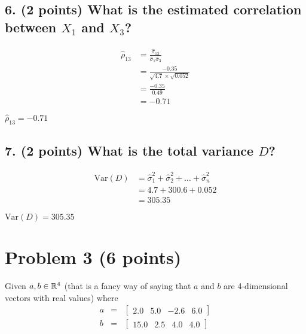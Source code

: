\documentclass[11pt]{article}
\begin{document}
\subsection*{\textbf{6. (2 points)} What is the estimated correlation between $X_1$ and $X_3$?}

\begin{align*}
    \hat{\rho}_{13} &= \frac{\hat{\sigma}_{13}}{\hat{\sigma}_1 \hat{\sigma}_3} \\
    &= \frac{-0.35}{ \sqrt{4.7} \times \sqrt{0.052}} \\
    &= \frac{-0.35}{0.49} \\
    &= -0.71
\end{align*}

\begin{tcolorbox}[title=Problem 2.6]
    $\hat{\rho}_{13} = -0.71$
\end{tcolorbox}

\subsection*{\textbf{7. (2 points)} What is the total variance $D$?}

\begin{align*}
    \text{Var}(D) &= \hat{\sigma}_1^2 + \hat{\sigma}_2^2 + \dots + \hat{\sigma}_n^2 \\
    & = 4.7 + 300.6 + 0.052 \\
    & = 305.35
\end{align*}

\begin{tcolorbox}[title=Problem 2.7]
    $\text{Var}(D) = 305.35$
\end{tcolorbox}

\newpage
\section*{Problem 3 (6 points)}

Given $a, b \in \mathbb{R}^4$ (that is a fancy way of saying that $a$ and $b$ are
4-dimensional vectors with real values) where
\begin{eqnarray*}
    a &=& \begin{bmatrix} 2.0  & 5.0 & -2.6 & 6.0 \end{bmatrix} \\
    b &=& \begin{bmatrix} 15.0 & 2.5 &  4.0 & 4.0 \end{bmatrix}
\end{eqnarray*}
\end{document}

